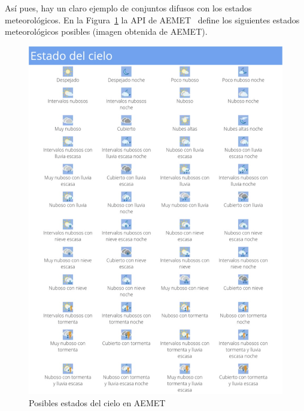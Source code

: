 Así pues, hay un claro ejemplo de conjuntos difusos con los estados meteorológicos. En la Figura~\ref{fig:estadoCielo} la \gls{API} de \gls{AEMET}~\cite{Aemet} define los siguientes estados meteorológicos posibles (imagen obtenida de \textcopyright AEMET).
\begin{figure}[H]
	\centering
	\includegraphics[width=17cm]{figs/estadoCieloAEMET.png}
	\caption{Posibles estados del cielo en AEMET}
	\label{fig:estadoCielo}
\end{figure}
